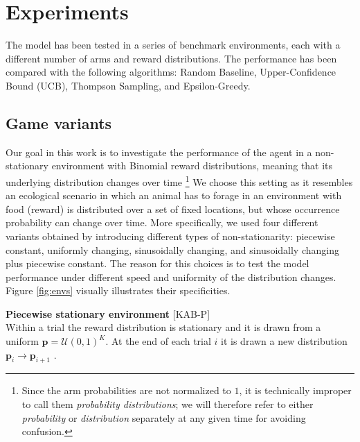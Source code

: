 \section{Experiments}

The model has been tested in a series of benchmark environments, each with a different number of arms and reward distributions. The performance has been compared with the following algorithms: Random Baseline, Upper-Confidence Bound (UCB), Thompson Sampling, and Epsilon-Greedy.

\subsection{Game variants} %

\noindent Our goal in this work is to investigate the performance of the agent in a non-stationary environment with Binomial reward distributions, meaning that its underlying distribution changes over time \footnote{Since the arm probabilities are not normalized to $1$, it is
technically improper to call them \textit{probability distributions}; we will therefore refer to either \textit{probability} or \textit{distribution} separately at any given time for avoiding confusion.}
We choose this setting as it resembles an ecological scenario in which an animal has to forage in an environment with food (reward) is distributed over a set of fixed locations, but whose occurrence probability can change over time.
More specifically, we used four different variants obtained by introducing different types of non-stationarity: piecewise constant, uniformly changing, sinusoidally changing, and sinusoidally changing plus piecewise constant.
The reason for this choices is to test the model performance under different speed and uniformity of the distribution changes.
Figure \ref{fig:envs} visually illustrates their specificities.

\hfill \break
\noindent \textbf{Piecewise stationary environment} [\textsc{KAB-P}]\\ Within a trial the reward distribution is stationary and it is drawn from a uniform $\mathbf{p}=\mathcal{U}(0, 1)^{K}$. At the end of each trial $i$ it is drawn a new distribution $\mathbf{\mathbf{p}}_{i} \to \mathbf{\mathbf{p}}_{i+1}$ \cite{qiForcedExplorationBandit2023}.

